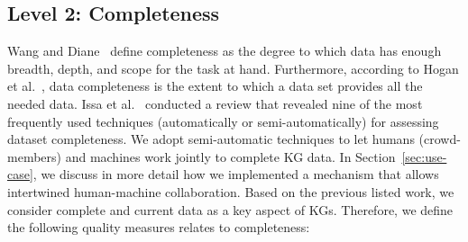 \documentclass[runningheads]{llncs}
\begin{document}
\subsection{Level 2: Completeness}
Wang and Diane~\cite{Wang1996quality} define completeness as the degree to which data has enough breadth, depth, and scope for the task at hand. 
Furthermore, according to Hogan et al.~\cite{hogan_knowledge_2022}, data completeness is the extent to which a data set provides all the needed data. Issa et al.~\cite{issa_knowledge_2021} conducted a review that revealed nine of the most frequently used techniques (automatically or semi-automatically) for assessing dataset completeness.
We adopt semi-automatic techniques to let humans (crowd-members) and machines work jointly to complete KG data.
In Section~\ref{sec:use-case}, we discuss in more detail how we implemented a mechanism that allows intertwined human-machine collaboration.
Based on the previous listed work, we consider complete and current data as a key aspect of KGs. 
Therefore, we define the following quality measures relates to completeness:
\end{document}
